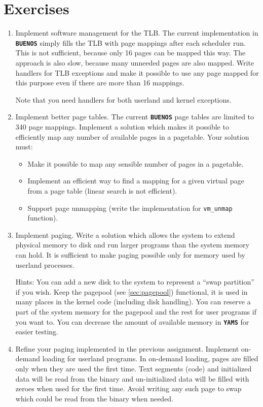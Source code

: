 \documentclass[twoside,a4paper]{report}
\newcommand{\buenos}{\texttt{\textbf{BUENOS}}}
\newcommand{\yams}{\texttt{\textbf{YAMS}}}
\newenvironment{exercises}[1][\addcontentsline{toc}{section}{Exercises}%
\section*{Exercises}\markright{EXERCISES}]{%
#1%
\begin{enumerate}%
}{%
\end{enumerate}
}
\newcounter{exercisec}[chapter]
\newcommand{\cexercise}[1]{%
\item[\stepcounter{exercisec}{\huge\Keyboard}\hspace{5mm}\textbf{\arabic{chapter}.\theexercisec{}.}] #1%
}
\begin{document}
\begin{exercises}

\cexercise{Implement software management for the TLB. The current
implementation in \buenos{} simply fills the TLB with page mappings
after each scheduler run. This is not sufficient, because only 16
pages can be mapped this way. The approach is also slow, because many
unneeded pages are also mapped. Write handlers for TLB exceptions and
make it possible to use any page mapped for this purpose even if there
are more than 16 mappings.

Note that you need handlers for both userland and kernel exceptions.}

\cexercise{Implement better page tables. The current \buenos{} page
tables are limited to 340 page mappings. Implement a solution which
makes it possible to efficiently map any number of available pages in
a pagetable. Your solution must:

\begin{itemize}
\item Make it possible to map any sensible number of pages in a
pagetable.

\item Implement an efficient way to find a mapping for a given virtual
page from a page table (linear search is not efficient).

\item Support page unmapping (write the implementation for
\texttt{vm\_unmap} function).
\end{itemize}}

\cexercise{Implement paging. Write a solution which allows the
system to extend physical memory to disk and run larger programs than
the system memory can hold. It is sufficient to make paging possible
only for memory used by userland processes.

Hints: You can add a new disk to the system to represent a ``swap
partition'' if you wish. Keep the pagepool (see \autoref{sec:pagepool})
functional, it is used in many places in the kernel code (including
disk handling). You can reserve a part of the system memory for the
pagepool and the rest for user programs if you want to. You
can decrease the amount of available memory in \yams{} for easier
testing.}

\cexercise{Refine your paging implemented in the previous
assignment. Implement on-demand loading for userland programs. In
on-demand loading, pages are filled only when they are used the first
time. Text segments (code) and initialized data will be read from the
binary and un-initialized data will be filled with zeroes when used
for the first time. Avoid writing any such page to swap which could be
read from the binary when needed.}


\end{exercises}
\end{document}
